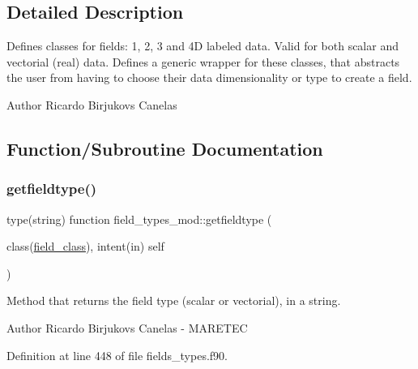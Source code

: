 \subsection{Detailed Description}
Defines classes for \textquotesingle{}fields\textquotesingle{}\+: 1, 2, 3 and 4D labeled data. Valid for both scalar and vectorial (real) data. Defines a generic wrapper for these classes, that abstracts the user from having to choose their data dimensionality or type to create a field. 

\begin{DoxyAuthor}{Author}
Ricardo Birjukovs Canelas 
\end{DoxyAuthor}


\subsection{Function/\+Subroutine Documentation}
\mbox{\label{namespacefield__types__mod_aef22f053fd727cf82be4386d65b47031}} 
\subsubsection{\texorpdfstring{getfieldtype()}{getfieldtype()}}
{\footnotesize\ttfamily type(string) function field\+\_\+types\+\_\+mod\+::getfieldtype (\begin{DoxyParamCaption}\item[{class(\mbox{\hyperlink{structfield__types__mod_1_1field__class}{field\+\_\+class}}), intent(in)}]{self }\end{DoxyParamCaption})\hspace{0.3cm}{\ttfamily [private]}}



Method that returns the field type (scalar or vectorial), in a string. 

\begin{DoxyAuthor}{Author}
Ricardo Birjukovs Canelas -\/ M\+A\+R\+E\+T\+EC 
\end{DoxyAuthor}


Definition at line 448 of file fields\+\_\+types.\+f90.


